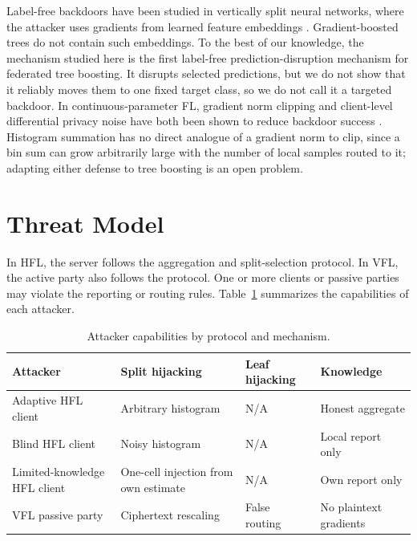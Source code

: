 \documentclass[11pt]{article}
\newcommand{\rev}[1]{#1}
\begin{document}
Label-free backdoors have been studied in vertically split neural networks, where the attacker uses gradients from learned feature embeddings \cite{shen2025labelfree}. Gradient-boosted trees do not contain such embeddings. To the best of our knowledge, the \rev{mechanism} studied here is the first label-\rev{free prediction-disruption mechanism} for federated tree boosting. It disrupts selected predictions, but we do not show that it reliably moves them to one fixed target class\rev{, so we do not call it a targeted backdoor}. In continuous-parameter FL, gradient norm clipping and client-level differential privacy noise have both been shown to reduce backdoor success \cite{sun2019backdoor,geyer2017dpfed}. Histogram summation has no direct analogue of a gradient norm to clip, since a bin sum can grow arbitrarily large with the number of local samples routed to it; adapting either defense to tree boosting is an open problem.

\section{Threat Model}
\label{sec:threatmodel}

In HFL, the server follows the aggregation and split-selection protocol. In VFL, the active party also follows the protocol. One or more clients or passive parties may violate the reporting or routing rules. Table~\ref{tab:threatmodel} summarizes the capabilities of each attacker.

\begin{table}[htbp]
\centering
\caption{Attacker capabilities by protocol and mechanism.}
\begin{tabular}{>{\raggedright\arraybackslash}p{3.4cm}>{\raggedright\arraybackslash}p{4.0cm}>{\raggedright\arraybackslash}p{2.1cm}>{\raggedright\arraybackslash}p{3.4cm}}
\toprule
Attacker & Split hijacking & Leaf hijacking & Knowledge \\
\midrule
Adaptive HFL client & Arbitrary histogram & N/A & Honest aggregate \\
Blind HFL client & Noisy histogram & N/A & Local report only \\
\rev{Limited-knowledge HFL client} & \rev{One-cell injection from own estimate} & N/A & \rev{Own report only} \\
VFL passive party & Ciphertext rescaling & False routing & No plaintext gradients \\
\bottomrule
\end{tabular}
\label{tab:threatmodel}
\end{table}
\end{document}
